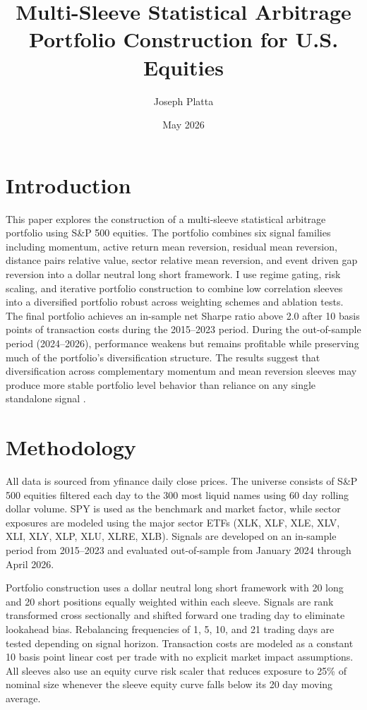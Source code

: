 \documentclass{article}
\title{Multi-Sleeve Statistical Arbitrage Portfolio Construction for U.S. Equities}
\author{Joseph Platta}
\date{May 2026}
\begin{document}
\maketitle

\section{Introduction}

This paper explores the construction of a multi-sleeve statistical arbitrage portfolio using S\&P 500 equities. The portfolio combines six signal families including momentum, active return mean reversion, residual mean reversion, distance pairs relative value, sector relative mean reversion, and event driven gap reversion into a dollar neutral long short framework. I use regime gating, risk scaling, and iterative portfolio construction to combine low correlation sleeves into a diversified portfolio robust across weighting schemes and ablation tests. The final portfolio achieves an in-sample net Sharpe ratio above 2.0 after 10 basis points of transaction costs during the 2015–2023 period. During the out-of-sample period (2024–2026), performance weakens but remains profitable while preserving much of the portfolio’s diversification structure. The results suggest that diversification across complementary momentum and mean reversion sleeves may produce more stable portfolio level behavior than reliance on any single standalone signal \cite{Chan2009, Chan2013}.

\section{Methodology}

All data is sourced from yfinance daily close prices. The universe consists of S\&P 500 equities filtered each day to the 300 most liquid names using 60 day rolling dollar volume. SPY is used as the benchmark and market factor, while sector exposures are modeled using the major sector ETFs (XLK, XLF, XLE, XLV, XLI, XLY, XLP, XLU, XLRE, XLB). Signals are developed on an in-sample period from 2015–2023 and evaluated out-of-sample from January 2024 through April 2026.

Portfolio construction uses a dollar neutral long short framework with 20 long and 20 short positions equally weighted within each sleeve. Signals are rank transformed cross sectionally and shifted forward one trading day to eliminate lookahead bias. Rebalancing frequencies of 1, 5, 10, and 21 trading days are tested depending on signal horizon. Transaction costs are modeled as a constant 10 basis point linear cost per trade with no explicit market impact assumptions. All sleeves also use an equity curve risk scaler that reduces exposure to 25\% of nominal size whenever the sleeve equity curve falls below its 20 day moving average.
\end{document}

